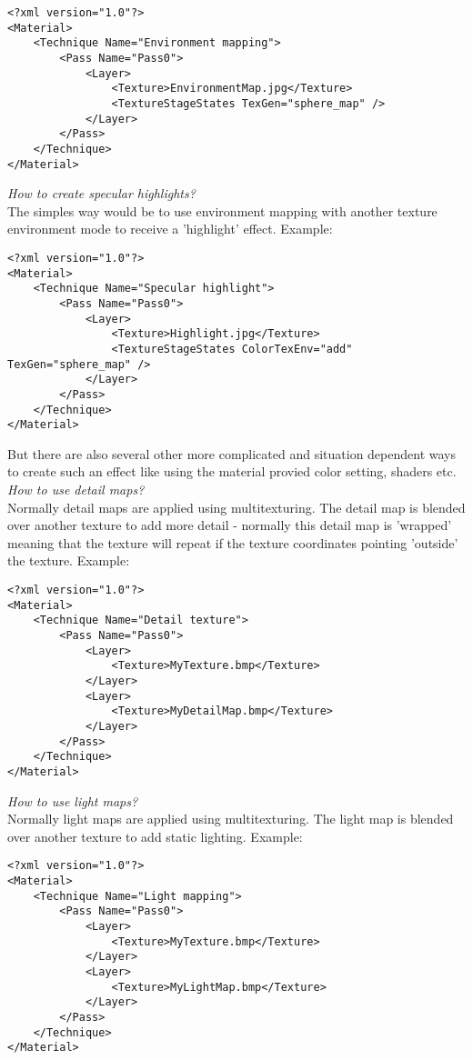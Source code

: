 \begin{lstlisting}[caption=Environment mapping]
<?xml version="1.0"?>
<Material>
	<Technique Name="Environment mapping">
		<Pass Name="Pass0">
			<Layer>
				<Texture>EnvironmentMap.jpg</Texture>
				<TextureStageStates TexGen="sphere_map" />
			</Layer>
		</Pass>
	</Technique>
</Material>
\end{lstlisting}


\emph{How to create specular highlights?}\\
The simples way would be to use environment mapping with another texture environment mode to
receive a 'highlight' effect. Example:\\

\begin{lstlisting}[caption=Specular highlights]
<?xml version="1.0"?>
<Material>
	<Technique Name="Specular highlight">
		<Pass Name="Pass0">
			<Layer>
				<Texture>Highlight.jpg</Texture>
				<TextureStageStates ColorTexEnv="add" TexGen="sphere_map" />
			</Layer>
		</Pass>
	</Technique>
</Material>
\end{lstlisting}

But there are also several other more complicated and situation dependent ways to create such
an effect like using the material provied color setting, shaders etc.\\


\emph{How to use detail maps?}\\
Normally detail maps are applied using multitexturing. The detail map is blended over another
texture to add more detail - normally this detail map is 'wrapped' meaning that the texture will
repeat if the texture coordinates pointing 'outside' the texture. Example:\\

\begin{lstlisting}[caption=Detail texture]
<?xml version="1.0"?>
<Material>
	<Technique Name="Detail texture">
		<Pass Name="Pass0">
			<Layer>
				<Texture>MyTexture.bmp</Texture>
			</Layer>
			<Layer>
				<Texture>MyDetailMap.bmp</Texture>
			</Layer>
		</Pass>
	</Technique>
</Material>
\end{lstlisting}

\emph{How to use light maps?}\\
Normally light maps are applied using multitexturing. The light map is blended over another
texture to add static lighting. Example:\\

\begin{lstlisting}[caption=Light mapping]
<?xml version="1.0"?>
<Material>
	<Technique Name="Light mapping">
		<Pass Name="Pass0">
			<Layer>
				<Texture>MyTexture.bmp</Texture>
			</Layer>
			<Layer>
				<Texture>MyLightMap.bmp</Texture>
			</Layer>
		</Pass>
	</Technique>
</Material>
\end{lstlisting}



